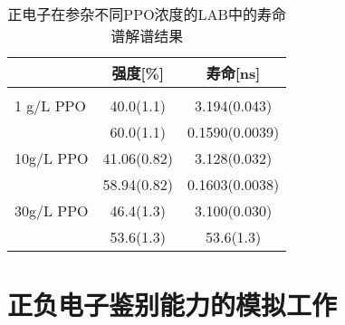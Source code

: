 \begin{table}[htbp]
\centering  %
\begin{tabular}{lcc}  %
\hline
&强度[\%]&寿命[ns] \\ \hline  %
\\ 1 g/L PPO &40.0(1.1)  & 3.194(0.043) %
\\ & 60.0(1.1) &0.1590(0.0039)
\\ 10g/L PPO&41.06(0.82)               & 3.128(0.032)                            %
\\  &58.94(0.82)               &0.1603(0.0038)
\\  30g/L PPO&46.4(1.3)                 &3.100(0.030)
\\  & 53.6(1.3)                &53.6(1.3)
\\ \hline
\end{tabular}
\caption{正电子在参杂不同PPO浓度的LAB中的寿命谱解谱结果}
\label{tab:ppo}
\end{table}

\section{正负电子鉴别能力的模拟工作}
